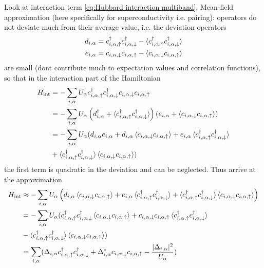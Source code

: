 \documentclass[../notes.tex]{subfiles}
\begin{document}
Look at interaction term \cref{eq:Hubbard interaction multiband}.
Mean-field approximation (here specifically for superconductivity i.e. pairing): operators do not deviate much from their average value, i.e. the deviation operators 
\begin{align}
	d_{i, \alpha} = c_{i, \alpha, \uparrow}^{\dagger} c_{i, \alpha, \downarrow}^{\dagger} - \braket{c_{i, \alpha, \uparrow}^{\dagger} c_{i, \alpha, \downarrow}^{\dagger}} \\
	e_{i, \alpha} = c_{i, \alpha, \downarrow} c_{i, \alpha, \uparrow} - \braket{c_{i, \alpha, \downarrow} c_{i, \alpha, \uparrow}}
\end{align}
are small (dont contribute much to expectation values and correlation functions), so that in the interaction part of the Hamiltonian
\begin{align}
	H_{\mathrm{int}} &= -\sum_{i, \alpha} U_{\alpha} c_{i, \alpha, \uparrow}^{\dagger} c_{i, \alpha, \downarrow}^{\dagger} c_{i, \alpha, \downarrow} c_{i, \alpha, \uparrow} \\
	&= -\sum_{i, \alpha} U_{\alpha} 
	\left( d_{i, \alpha}^{\dagger} + \braket{c_{i, \alpha, \uparrow}^{\dagger} c_{i, \alpha, \downarrow}^{\dagger}} \right)
	\left( e_{i, \alpha} + \braket{c_{i, \alpha, \downarrow} c_{i, \alpha, \uparrow}} \right) \\
	&= -\sum_{i, \alpha} U_{\alpha} (
		d_{i, \alpha} e_{i, \alpha}
		+ d_{i, \alpha} \braket{c_{i, \alpha, \downarrow} c_{i, \alpha, \uparrow}}
		+ e_{i, \alpha} \braket{c_{i, \alpha, \uparrow}^{\dagger} c_{i, \alpha, \downarrow}^{\dagger}} \\
		&+ \braket{c_{i, \alpha, \uparrow}^{\dagger} c_{i, \alpha, \downarrow}^{\dagger}} \braket{c_{i, \alpha, \downarrow} c_{i, \alpha, \uparrow}} )
\end{align}
the first term is quadratic in the deviation and can be neglected.
Thus arrive at the approximation
\begin{align}
	H_{\mathrm{int}} &\approx -\sum_{i, \alpha} U_{\alpha} \left(
	d_{i, \alpha} \braket{c_{i, \alpha, \downarrow} c_{i, \alpha, \uparrow}}
	+ e_{i, \alpha} \braket{c_{i, \alpha, \uparrow}^{\dagger} c_{i, \alpha, \downarrow}^{\dagger}}
	+ \braket{c_{i, \alpha, \uparrow}^{\dagger} c_{i, \alpha, \downarrow}^{\dagger}} \braket{c_{i, \alpha, \downarrow} c_{i, \alpha, \uparrow}}
	\right) \\
	&= -\sum_{i, \alpha} U_{\alpha} (
		c_{i, \alpha, \uparrow}^{\dagger} c_{i, \alpha, \downarrow}^{\dagger} \braket{c_{i, \alpha, \downarrow} c_{i, \alpha, \uparrow}}
		+ c_{i, \alpha, \downarrow} c_{i, \alpha, \uparrow} \braket{c_{i, \alpha, \uparrow}^{\dagger} c_{i, \alpha, \downarrow}^{\dagger}} \\	
	&- \braket{c_{i, \alpha, \uparrow}^{\dagger} c_{i, \alpha, \downarrow}^{\dagger}} \braket{c_{i, \alpha, \downarrow} c_{i, \alpha, \uparrow}} ) \\
	&= \sum_{i, \alpha} (\Delta_{i, \alpha} c_{i, \alpha, \uparrow}^{\dagger} c_{i, \alpha, \downarrow}^{\dagger} + \Delta_{i, \alpha}^{*} c_{i, \alpha, \downarrow} c_{i, \alpha, \uparrow} - \frac{\vert \Delta_{i, \alpha} \vert^2}{U_{\alpha}})
\end{align}
\end{document}
